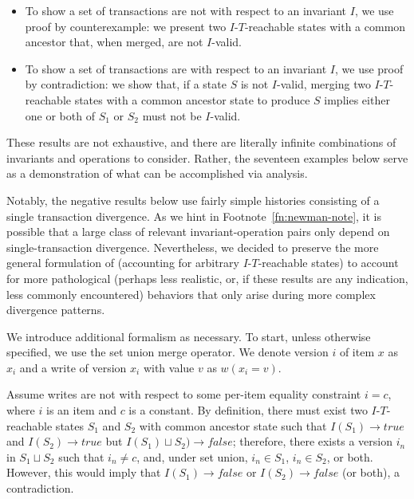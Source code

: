 \begin{itemize}

\item To show a set of transactions are not \iconfluent with respect to an invariant $I$, we use proof by counterexample: we present two $I$-$T$-reachable states with a common ancestor that, when merged, are not $I$-valid. 

\item To show a set of transactions are \iconfluent with respect to an invariant $I$, we use proof by contradiction: we show that, if a state $S$ is not $I$-valid, merging two $I$-$T$-reachable states with a common ancestor state to produce $S$ implies either one or both of $S_1$ or $S_2$ must not be $I$-valid.

\end{itemize}

These results are not exhaustive, and there are literally infinite combinations of invariants and operations to consider. Rather, the seventeen examples below serve as a demonstration of what can be accomplished via \iconfluence analysis.

Notably, the negative results below use fairly simple histories consisting of a single transaction divergence. As we hint in Footnote~\ref{fn:newman-note}, it is possible that a large class of relevant invariant-operation pairs only depend on single-transaction divergence. Nevertheless, we decided to preserve the more general formulation of \iconfluence (accounting for arbitrary $I$-$T$-reachable states) to account for more pathological (perhaps less realistic, or, if these results are any indication, less commonly encountered) behaviors that only arise during more complex divergence patterns.

We introduce additional formalism as necessary. To start, unless otherwise specified, we use the set union merge operator. We denote version $i$ of item $x$ as $x_i$ and a write of version $x_i$ with value $v$ as $w(x_i=v)$.

\begin{claim}
\label{claim:eq-proof}
Assume writes are not \iconfluent with respect to some per-item equality constraint $i=c$, where $i$ is an item and $c$ is a constant. By definition, there must exist two $I$-$T$-reachable states $S_1$ and $S_2$ with common ancestor state such that $I(S_1) \rightarrow true$ and $I(S_2) \rightarrow true$ but $I(S_1) \sqcup S_2) \rightarrow false$; therefore, there exists a version $i_n$ in $S_1 \sqcup S_2$ such that $i_n \neq c$, and, under set union, $i_n \in S_1$, $i_n \in S_2$, or both. However, this would imply that $I(S_1) \rightarrow false$ or $I(S_2) \rightarrow false$ (or both), a contradiction.
\end{claim} 

